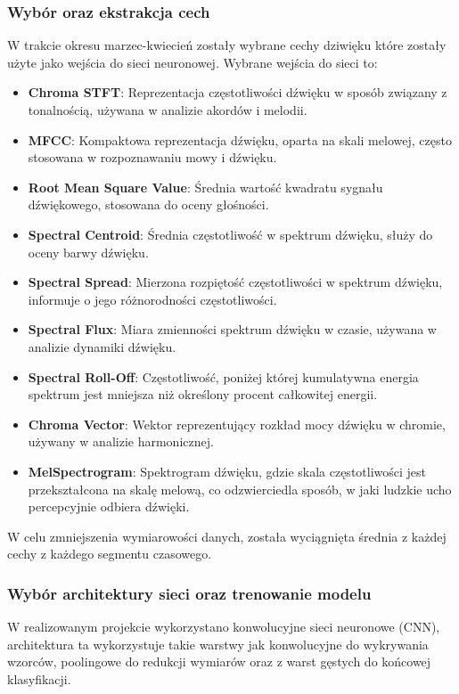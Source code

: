 \documentclass[12pt,titlepage]{article}
\begin{document}
\subsubsection{Wybór oraz ekstrakcja cech}
W trakcie okresu marzec-kwiecień zostały wybrane cechy dziwięku które zostały użyte jako wejścia do sieci neuronowej. Wybrane wejścia do sieci to:
\begin{itemize}
    \item \textbf{Chroma STFT}: Reprezentacja częstotliwości dźwięku w sposób związany z tonalnością, używana w analizie akordów i melodii.
    \item \textbf{MFCC}: Kompaktowa reprezentacja dźwięku, oparta na skali melowej, często stosowana w rozpoznawaniu mowy i dźwięku.
    \item \textbf{Root Mean Square Value}: Średnia wartość kwadratu sygnału dźwiękowego, stosowana do oceny głośności.
    \item \textbf{Spectral Centroid}: Średnia częstotliwość w spektrum dźwięku, służy do oceny barwy dźwięku.
    \item \textbf{Spectral Spread}: Mierzona rozpiętość częstotliwości w spektrum dźwięku, informuje o jego różnorodności częstotliwości.
    \item \textbf{Spectral Flux}: Miara zmienności spektrum dźwięku w czasie, używana w analizie dynamiki dźwięku.
    \item \textbf{Spectral Roll-Off}: Częstotliwość, poniżej której kumulatywna energia spektrum jest mniejsza niż określony procent całkowitej energii.
    \item \textbf{Chroma Vector}: Wektor reprezentujący rozkład mocy dźwięku w chromie, używany w analizie harmonicznej.
    \item \textbf{MelSpectrogram}: Spektrogram dźwięku, gdzie skala częstotliwości jest przekształcona na skalę melową, co odzwierciedla sposób, w jaki ludzkie ucho percepcyjnie odbiera dźwięki.
\end{itemize}
W celu zmniejszenia wymiarowości danych, została wyciągnięta średnia z każdej cechy z każdego segmentu czasowego.\\
\subsubsection{Wybór architektury sieci oraz trenowanie modelu}
W realizowanym projekcie wykorzystano konwolucyjne sieci neuronowe (CNN), architektura ta wykorzystuje takie warstwy jak konwolucyjne do wykrywania wzorców, poolingowe do redukcji wymiarów oraz z warst gęstych do końcowej klasyfikacji.
\end{document}
